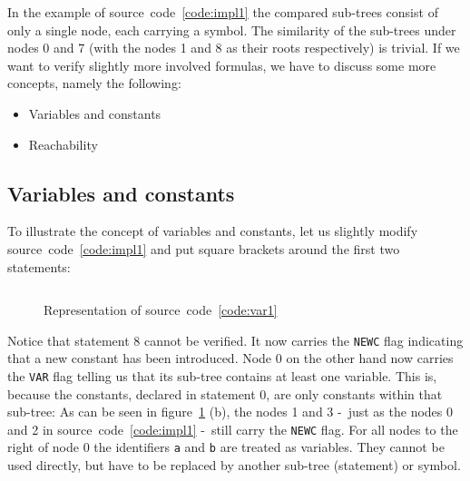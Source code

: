 \documentclass[british]{article}
\newenvironment{code}{\captionsetup{type=listing}}{}
\newcommand\prv{bc}
\newcommand\m[1]{\texttt{#1}}
\begin{document}
In the example of source~code~\ref{code:impl1} the compared sub-trees consist of
only a single node, each carrying a symbol. The similarity of the sub-trees
under nodes 0 and 7 (with the nodes 1 and 8 as their roots respectively) is
trivial. If we want to verify slightly more involved formulas, we have to
discuss some more concepts, namely the following:

\begin{itemize}
	\item 
		Variables and constants
	\item 
		Reachability
\end{itemize}

\pagebreak{}

\subsection{Variables and constants}\label{sec:var}

To illustrate the concept of variables and constants, let us slightly modify
source~code~\ref{code:impl1} and put square brackets around the first two
statements:

\begin{code}
\label{code:var1}
\inputminted[linenos]{\prv}{examples/var1.prove}
\end{code}

\begin{figure}[!h]
\caption{Representation of source~code~\ref{code:var1}}\label{fig:var1}
\centering
{}
\end{figure}

Notice that statement 8 cannot be verified. It now carries the \texttt{NEWC}
flag indicating that a new constant has been introduced. Node 0 on the other
hand now carries the \texttt{VAR} flag telling us that its sub-tree contains at
least one variable.  This is, because the constants, declared in statement 0,
are only constants within that sub-tree: As can be seen in figure~\ref{fig:var1}
(b), the nodes 1 and 3 -\ just as the nodes 0 and 2 in
source~code~\ref{code:impl1} -\ still carry the \texttt{NEWC} flag.  For all
nodes to the right of node 0 the identifiers \m{a} and \m{b} are treated as
variables. They cannot be used directly, but have to be replaced by another
sub-tree (statement) or symbol.
\end{document}
